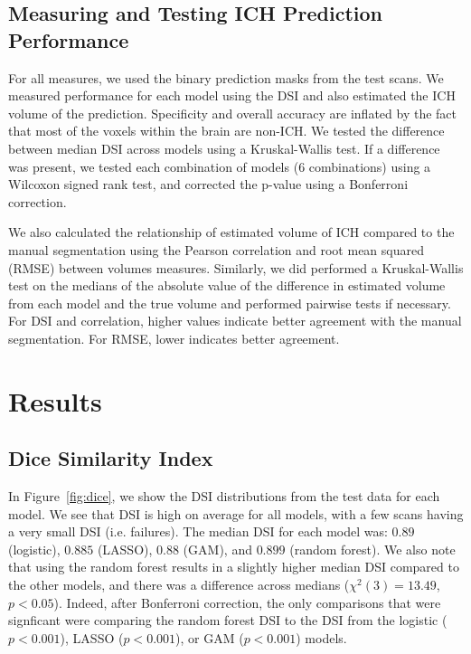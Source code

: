\documentclass{elsarticle_nonatbib}\usepackage[]{graphicx}\usepackage[]{color}
\begin{document}
\subsection{Measuring and Testing ICH Prediction Performance}





For all measures, we used the binary prediction masks from the test scans.  We measured performance for each model using the DSI and also estimated the ICH volume of the prediction. Specificity and overall accuracy are inflated by the fact that most of the voxels within the brain are non-ICH.  We tested the difference between median DSI across models using a Kruskal-Wallis test.  If a difference was present, we tested each combination of models ($6$ combinations) using a Wilcoxon signed rank test, and corrected the p-value using a Bonferroni correction.


We also calculated the relationship of estimated volume of ICH compared to the manual segmentation using the Pearson correlation and root mean squared (RMSE) between volumes measures.  Similarly, we did performed a Kruskal-Wallis test on the medians of the absolute value of the difference in estimated volume from each model and the true volume and performed pairwise tests if necessary.  For DSI and correlation, higher values indicate better agreement with the manual segmentation.  For RMSE, lower indicates better agreement.


\section{Results}

\subsection{Dice Similarity Index}
In Figure~\ref{fig:dice}, we show the DSI distributions from the test data for each model.  We see that DSI is high on average for all models, with a few scans having a very small DSI (i.e. failures).   The median DSI for each model was: $0.89$ (logistic), $0.885$  (LASSO), $0.88$ (GAM), and $0.899$ (random forest). 
We also note that using the random forest results in a slightly higher median DSI compared to the other models, and there was a difference across medians ($\chi^{2}(3)=13.49$, $p < 0.05$).  Indeed, after Bonferroni correction, the only comparisons that were signficant were comparing the random forest DSI to the DSI from the logistic ($p < 0.001$), LASSO ($p < 0.001$), or GAM ($p < 0.001$) models.
\end{document}
